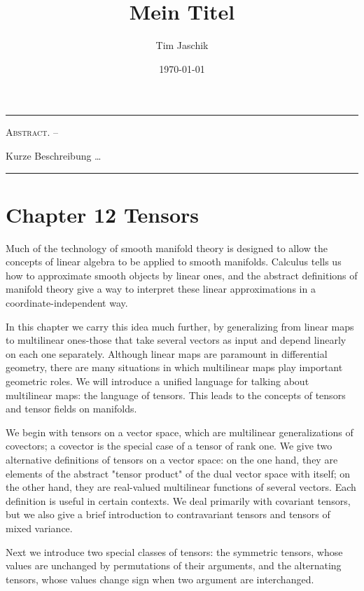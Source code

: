 \documentclass[10pt, letterpaper]{article}
\title{Mein Titel}
\author{Tim Jaschik}
\date{\today}
\renewenvironment{abstract}
  {
    \begin{adjustwidth}{1.5cm}{1.5cm}
    \small
    \textsc{Abstract. –}%
  }
  {
    \end{adjustwidth}
  }
\begin{document}
\maketitle
\rule{\textwidth}{0.5pt}
\begin{abstract}
Kurze Beschreibung …
\end{abstract}
\rule{\textwidth}{0.5pt}
\vspace{0.5cm}

\tableofcontents

\pagebreak


\section*{Chapter 12 Tensors}

Much of the technology of smooth manifold theory is designed to allow the concepts of linear algebra to be applied to smooth manifolds. Calculus tells us how to approximate smooth objects by linear ones, and the abstract definitions of manifold theory give a way to interpret these linear approximations in a coordinate-independent way.

In this chapter we carry this idea much further, by generalizing from linear maps to multilinear ones-those that take several vectors as input and depend linearly on each one separately. Although linear maps are paramount in differential geometry, there are many situations in which multilinear maps play important geometric roles. We will introduce a unified language for talking about multilinear maps: the language of tensors. This leads to the concepts of tensors and tensor fields on manifolds.

We begin with tensors on a vector space, which are multilinear generalizations of covectors; a covector is the special case of a tensor of rank one. We give two alternative definitions of tensors on a vector space: on the one hand, they are elements of the abstract "tensor product" of the dual vector space with itself; on the other hand, they are real-valued multilinear functions of several vectors. Each definition is useful in certain contexts. We deal primarily with covariant tensors, but we also give a brief introduction to contravariant tensors and tensors of mixed variance.

Next we introduce two special classes of tensors: the symmetric tensors, whose values are unchanged by permutations of their arguments, and the alternating tensors, whose values change sign when two argument are interchanged.
\end{document}
